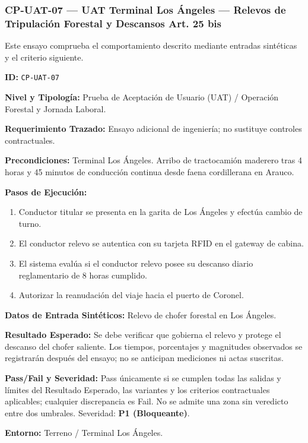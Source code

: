 \subsubsection*{CP-UAT-07 — UAT Terminal Los Ángeles — Relevos de Tripulación Forestal y Descansos Art. 25 bis}\label{sec:9-cp-uat-07}
Este ensayo comprueba el comportamiento descrito mediante entradas sintéticas y el criterio siguiente.

\par\noindent\textbf{ID:} \texttt{C\allowbreak{}P\allowbreak{}-\allowbreak{}U\allowbreak{}A\allowbreak{}T\allowbreak{}-\allowbreak{}0\allowbreak{}7\allowbreak{}}\par
\par\noindent\textbf{Nivel y Tipología:} Prueba de Aceptación de Usuario (UAT) / Operación Forestal y Jornada Laboral.\par
\par\noindent\textbf{Requerimiento Trazado:} Ensayo adicional de ingeniería; no sustituye controles contractuales.\par
\par\noindent\textbf{Precondiciones:} Terminal Los Ángeles. Arribo de tractocamión maderero tras 4 horas y 45 minutos de conducción continua desde faena cordillerana en Arauco.\par
\par\noindent\textbf{Pasos de Ejecución:} \par
\begin{enumerate}
\item Conductor titular se presenta en la garita de Los Ángeles y efectúa cambio de turno.
\item El conductor relevo se autentica con su tarjeta RFID en el gateway de cabina.
\item El sistema evalúa si el conductor relevo posee su descanso diario reglamentario de 8 horas cumplido.
\item Autorizar la reanudación del viaje hacia el puerto de Coronel.
\end{enumerate}
\par\noindent\textbf{Datos de Entrada Sintéticos:} Relevo de chofer forestal en Los Ángeles.\par
\par\noindent\textbf{Resultado Esperado:} Se debe verificar que gobierna el relevo y protege el descanso del chofer saliente. Los tiempos, porcentajes y magnitudes observados se registrarán después del ensayo; no se anticipan mediciones ni actas suscritas.\par
\par\noindent\textbf{Pass/Fail y Severidad:} Pass únicamente si se cumplen todas las salidas y límites del Resultado Esperado, las variantes y los criterios contractuales aplicables; cualquier discrepancia es Fail. No se admite una zona sin veredicto entre dos umbrales. Severidad: \textbf{P1 (Bloqueante)}.\par
\par\noindent\textbf{Entorno:} Terreno / Terminal Los Ángeles.\par






